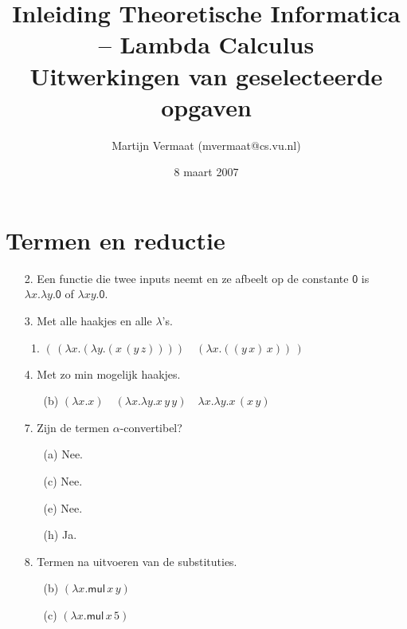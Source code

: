 \documentclass[a4paper,11pt]{article}
\title{Inleiding Theoretische Informatica -- Lambda Calculus\\
\normalsize{Uitwerkingen van geselecteerde opgaven}}
\author{Martijn Vermaat (mvermaat@cs.vu.nl)}
\date{8 maart 2007}
\begin{document}
\maketitle


\section{Termen en reductie}


\begin{enumerate}


\item[2.]
Een functie die twee inputs neemt en ze afbeelt op de constante $\textsf{0}$ is
$\lambda x. \lambda y. \textsf{0}$ of $\lambda xy. \textsf{0}$.


\item[3.]
Met alle haakjes en alle $\lambda$'s.
\begin{enumerate}

\item
$( \, (\lambda x. (\lambda y. (x \, (y \, z)))) \quad (\lambda x. ((y \, x) \, x)) \, )$

\end{enumerate}


\item[4.]
Met zo min mogelijk haakjes.
\begin{enumerate}

\item[(b)]
$(\lambda x. x) \quad (\lambda x. \lambda y. x \, y \, y) \quad \lambda x. \lambda y. x \, (x \, y)$

\end{enumerate}


\item[7.]
Zijn de termen $\alpha$-convertibel?
\begin{enumerate}

\item[(a)] Nee.
\item[(c)] Nee.
\item[(e)] Nee.
\item[(h)] Ja.

\end{enumerate}


\item[8.]
Termen na uitvoeren van de substituties.
\begin{enumerate}

\item[(b)] $(\lambda x. \textsf{mul} \, x \, y)$

\item[(c)] $(\lambda x. \textsf{mul} \, x \, 5)$


\end{enumerate}
\end{enumerate}
\end{document}
